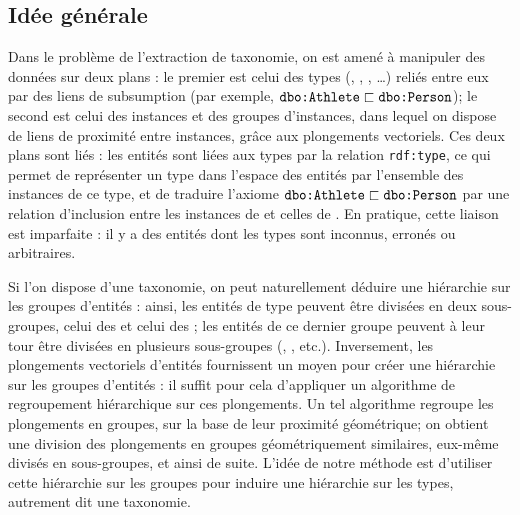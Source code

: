 
\subsection{Idée générale}

Dans le problème de l'extraction de taxonomie, on est amené à manipuler des données sur deux plans : le premier est celui des types (, , , \ldots) reliés entre eux par des liens de subsumption (par exemple, $\texttt{dbo:Athlete} \sqsubset \texttt{dbo:Person}$); le second est celui des instances et des groupes d'instances, dans lequel on dispose de liens de proximité entre instances, grâce aux plongements vectoriels. %
Ces deux plans sont liés : les entités sont liées aux types par la relation \texttt{rdf:type}, ce qui permet de représenter un type dans l'espace des entités par l'ensemble des instances de ce type, et de traduire l'axiome $\texttt{dbo:Athlete} \sqsubset \texttt{dbo:Person}$ par une relation d'inclusion entre les instances de  et celles de . En pratique, cette liaison est imparfaite : il y a des entités dont les types sont inconnus, erronés ou arbitraires.


Si l'on dispose d'une taxonomie, on peut naturellement déduire une hiérarchie sur les groupes d'entités : ainsi, les entités de type  peuvent être divisées en deux sous-groupes, celui des  et celui des ; les entités de ce dernier groupe peuvent à leur tour être divisées en plusieurs sous-groupes (, , etc.). Inversement, les plongements vectoriels d'entités fournissent un moyen pour créer une hiérarchie sur les groupes d'entités : il suffit pour cela d'appliquer un algorithme de regroupement hiérarchique sur ces plongements. Un tel algorithme regroupe les plongements en groupes, sur la base de leur proximité géométrique; on obtient une division des plongements en groupes géométriquement similaires, eux-même divisés en sous-groupes, et ainsi de suite. L'idée de notre méthode est d'utiliser cette hiérarchie sur les groupes pour induire une hiérarchie sur les types, autrement dit une taxonomie.

